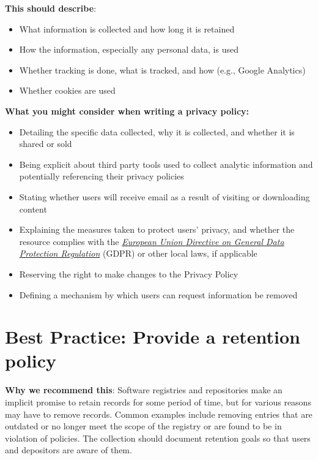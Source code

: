 \documentclass[11pt]{article}
\begin{document}
\textbf{This should describe}:

\begin{itemize}
\item What information is collected and how long it is retained

\item How the information, especially any personal data, is used

\item Whether tracking is done, what is tracked, and how (e.g., Google Analytics)

\item Whether cookies are used

\end{itemize}

\textbf{What you might consider when writing a privacy policy:}

\begin{itemize}
\item Detailing the specific data collected, why it is collected, and whether it is shared or sold

\item Being explicit about third party tools used to collect analytic information and potentially referencing their privacy policies

\item Stating whether users will receive email as a result of visiting or downloading content

\item Explaining the measures taken to protect users' privacy, and whether the resource complies with the \href{https://gdpr-info.eu/}{\emph{European Union Directive on General Data Protection Regulation}} (GDPR) or other local laws, if applicable

\item Reserving the right to make changes to the Privacy Policy

\item Defining a mechanism by which users can request information be removed

\end{itemize}


\section{Best Practice: Provide a retention policy}
\label{best-practice-provide-a-retention-policy}

\textbf{Why we recommend this}: Software registries and repositories make an implicit promise to retain records for some period of time, but for various reasons may have to remove records. Common examples include removing entries that are outdated or no longer meet the scope of the registry or are found to be in violation of policies. The collection should document retention goals so that users and depositors are aware of them.
\end{document}
